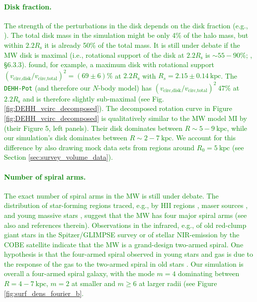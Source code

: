 \documentclass[iop,revtex4,numberedappendix,appendixfloats]{emulateapj}
\newcommand{\NEW}[1]{\textcolor{Green}{#1}}
\begin{document}
\NEW{\paragraph{Disk fraction.} The strength of the perturbations in the disk depends on the disk fraction (e.g., \citealt{2015ApJ...808L...8D}). The total disk mass in the simulation might be only 4\% of the halo mass, but within $2.2R_\text{s}$ it is already 50\% of the total mass. It is still under debate if the MW disk is maximal (i.e., rotational support of the disk at $2.2R_\text{s}$ is $\sim55-90\%$; \citealt{1997ApJ...483..103S, 2008gady.book.....B}, \S 6.3.3). \citet{2013ApJ...779..115B} found, for example, a maximum disk with rotational support $\left( v_\text{circ,disk}/v_\text{circ,total}\right)^2=(69\pm6)\%$ at $2.2R_\text{s}$ with $R_s=2.15\pm0.14~\text{kpc}$. The \texttt{DEHH-Pot} (and therefore our $N$-body model) has  $\left( v_\text{circ,disk}/v_\text{circ,total}\right)^2~47\%$ at $2.2R_\text{s}$ and is therefore slightly sub-maximal (see Fig. \ref{fig:DEHH_vcirc_decomposed}). The decomposed rotation curve in Figure \ref{fig:DEHH_vcirc_decomposed} is qualitatively similar to the MW model MI by \citep{2016A&A...593A.108B} (their Figure 5, left panels). Their disk dominates between $R\sim5-9~\text{kpc}$, while our simulation's disk dominates between $R\sim2-7~\text{kpc}$. We account for this difference by also drawing mock data sets from regions around $R_0=5~\text{kpc}$ (see Section \ref{sec:survey_volume_data}).}

\NEW{\paragraph{Number of spiral arms.}  The exact number of spiral arms in the MW is still under debate. The distribution of star-forming regions traced, e.g., by HII regions \citep{1976A&A....49...57G}, maser sources \citep{2009ApJ...700..137R,2014ApJ...783..130R}, and young massive stars \citep{2014MNRAS.437.1791U}, suggest that the MW has four major spiral arms (see also \citet{2008AJ....135.1301V,2014AJ....148....5V} and references therein). Observations in the infrared, e.g., of old red-clump giant stars  in the Spitzer/GLIMPSE survey \citep{2009PASP..121..213C} or of stellar NIR-emission by the COBE satellite \citep{2001ApJ...556..181D} indicate that the MW is a grand-design two-armed spiral. One hypothesis is that the four-armed spiral observed in young stars and gas is due to the response of the gas to the two-armed spiral in old stars \citep{2000A&A...358L..13D,2004MNRAS.350L..47M}. Our simulation is overall a four-armed spiral galaxy, with the mode $m=4$ dominating between $R=4-7~\text{kpc}$, $m=2$ at smaller and $m\geq6$ at larger radii (see Figure \ref{fig:surf_dens_fourier_b}.} 
\end{document}
